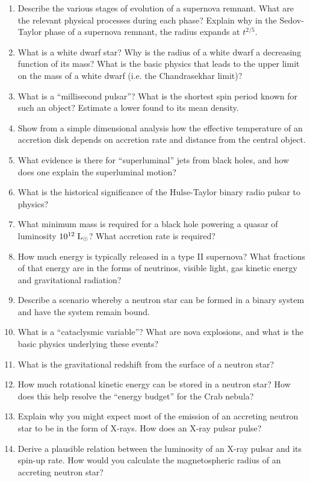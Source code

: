 \documentclass[10pt, oneside]{book}
\begin{document}
\begin{enumerate}[start=38]
    \item Describe the various stages of evolution of a supernova remnant. What are the relevant physical processes during each phase? Explain why in the Sedov-Taylor phase of a supernova remnant, the radius expands at $t^{2/5}$.
    \item What is a white dwarf star? Why is the radius of a white dwarf a decreasing function of its mass? What is the basic physics that leads to the upper limit on the mass of a white dwarf (i.e. the Chandrasekhar limit)?
    \item What is a ``millisecond pulsar''? What is the shortest spin period known for such an object? Estimate a lower found to its mean density.
    \item Show from a simple dimensional analysis how the effective temperature of an accretion disk depends on accretion rate and distance from the central object.
    \item What evidence is there for ``superluminal'' jets from black holes, and how does one explain the superluminal motion?
    \item What is the historical significance of the Hulse-Taylor binary radio pulsar to physics?
    \item What minimum mass is required for a black hole powering a quasar of luminosity $10^{12} \; {\rm L_{\odot}}$? What accretion rate is required?
    \item How much energy is typically released in a type II supernova? What fractions of that energy are in the forms of neutrinos, visible light, gas kinetic energy and gravitational radiation?
    \item Describe a scenario whereby a neutron star can be formed in a binary system and have the system remain bound.
    \item What is a ``cataclysmic variable''? What are nova explosions, and what is the basic physics underlying these events?
    \item What is the gravitational redshift from the surface of a neutron star?
    \item How much rotational kinetic energy can be stored in a neutron star? How does this help resolve the ``energy budget'' for the Crab nebula?
    \item Explain why you might expect most of the emission of an accreting neutron star to be in the form of X-rays. How does an X-ray pulsar pulse?
    \item Derive a plausible relation between the luminosity of an X-ray pulsar and its spin-up rate. How would you calculate the magnetospheric radius of an accreting neutron star?

\end{enumerate}
\end{document}
